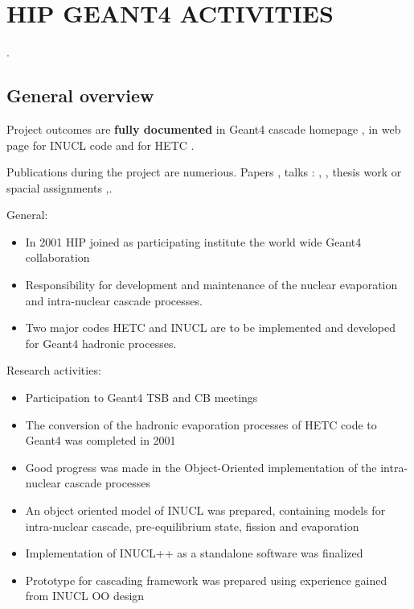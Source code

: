 \section{HIP GEANT4 ACTIVITIES}
\label{report:project}.

\subsection{General overview}

Project outcomes are {\bf fully documented} in {\sc Geant4} cascade homepage \cite{heikkinen02m},
in web page for INUCL code \cite{heikkinen02k} and for HETC  \cite{heikkinen02j}. 


Publications during the project are numerious. Papers \cite{heikkinen00a}, talks : \cite{heikkinen02i}, \cite{heikkinen02h}, thesis work or spacial assignments \cite{lampen00a} ,\cite{tillikainen01a}.


General:
\begin{itemize}
\item In 2001 HIP joined as participating institute the world wide Geant4 collaboration
\item Responsibility for development and maintenance of the nuclear evaporation and intra-nuclear cascade processes. 
\item Two major codes HETC and INUCL are to be implemented and developed for Geant4 hadronic processes.
\end{itemize}

Research activities:
\begin{itemize}
\item Participation to Geant4 TSB and CB meetings
\item The conversion of the hadronic evaporation processes of HETC code to Geant4 was completed in 2001
\item Good progress was made in the Object-Oriented implementation of the intra-nuclear cascade processes

\item An object oriented model of INUCL was prepared, containing models for intra-nuclear cascade, pre-equilibrium state, fission and evaporation 
\item Implementation of  INUCL++ as a standalone software was finalized

\item Prototype for cascading framework was prepared using experience gained from INUCL OO design
\end{itemize}


